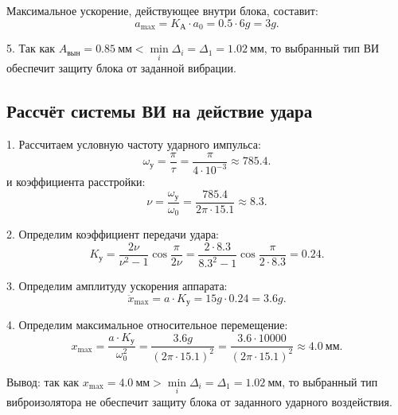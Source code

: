 Максимальное ускорение, действующее внутри блока, составит:
\[
    a_{\max} = K_{А} \cdot a_0
    = 0.5 \cdot 6g
    = 3g.
\]

5. Так как $A_{вын} = 0.85~мм < \min\limits_i \Delta_i = \Delta_1 = 1.02~мм$, то выбранный тип ВИ обеспечит защиту блока от заданной вибрации.

\subsection{Рассчёт системы ВИ на действие удара}
1. Рассчитаем условную частоту ударного импульса:
\[
    \omega_{у}
    = \frac{\pi}{\tau}
    = \frac{\pi}{4 \cdot 10^{-3}}
    \approx 785.4.
\]
и коэффициента расстройки:
\[
    \nu
    = \frac{\omega_{у}}{\omega_0}
    = \frac{785.4}{2 \pi \cdot 15.1}
    \approx 8.3.
\]

2. Определим коэффициент передачи удара:
\[
    K_{у}
    = \frac{2 \nu}{\nu^2 - 1} \cos \frac{\pi}{2 \nu}
    = \frac{2 \cdot 8.3}{8.3^2 - 1} \cos \frac{\pi}{2 \cdot 8.3}
    = 0.24.
\]

3. Определим амплитуду ускорения аппарата:
\[
    \ddot{x}_{\max}
    = a \cdot K_{у}
    = 15 g \cdot 0.24
    = 3.6 g.
\]

4. Определим максимальное относительное перемещение:
\[
    x_{\max}
    = \frac{a \cdot K_{у}}{\omega_0^2}
    = \frac{3.6 g}{\left(2 \pi \cdot 15.1\right)^2}
    = \frac{3.6 \cdot 10000}{\left(2 \pi \cdot 15.1\right)^2}
    \approx 4.0~мм.
\]

Вывод: так как $x_{\max} = 4.0~мм > \min\limits_i \Delta_i = \Delta_1 = 1.02~мм$, то выбранный тип виброизолятора не обеспечит защиту блока от заданного ударного воздействия.
